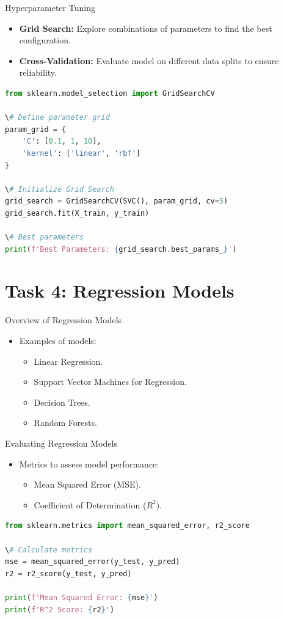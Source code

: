 \documentclass{beamer}
\begin{document}
\begin{frame}{Hyperparameter Tuning}
\begin{itemize}
    \item \textbf{Grid Search:} Explore combinations of parameters to find the best configuration.
    \item \textbf{Cross-Validation:} Evaluate model on different data splits to ensure reliability.
\end{itemize}
\begin{lstlisting}[language=Python, caption=Hyperparameter Tuning with Grid Search]
from sklearn.model_selection import GridSearchCV

\# Define parameter grid
param_grid = {
    'C': [0.1, 1, 10],
    'kernel': ['linear', 'rbf']
}

\# Initialize Grid Search
grid_search = GridSearchCV(SVC(), param_grid, cv=5)
grid_search.fit(X_train, y_train)

\# Best parameters
print(f'Best Parameters: {grid_search.best_params_}')
\end{lstlisting}
\end{frame}

\section{Task 4: Regression Models}

\begin{frame}{Overview of Regression Models}
\begin{itemize}
    \item Examples of models:
    \begin{itemize}
        \item Linear Regression.
        \item Support Vector Machines for Regression.
        \item Decision Trees.
        \item Random Forests.
    \end{itemize}
\end{itemize}
\end{frame}

\begin{frame}{Evaluating Regression Models}
\begin{itemize}
    \item Metrics to assess model performance:
    \begin{itemize}
        \item Mean Squared Error (MSE).
        \item Coefficient of Determination ($R^2$).
    \end{itemize}
\end{itemize}
\begin{lstlisting}[language=Python, caption=Evaluating Regression Models]
from sklearn.metrics import mean_squared_error, r2_score

\# Calculate metrics
mse = mean_squared_error(y_test, y_pred)
r2 = r2_score(y_test, y_pred)

print(f'Mean Squared Error: {mse}')
print(f'R^2 Score: {r2}')
\end{lstlisting}
\end{frame}
\end{document}
